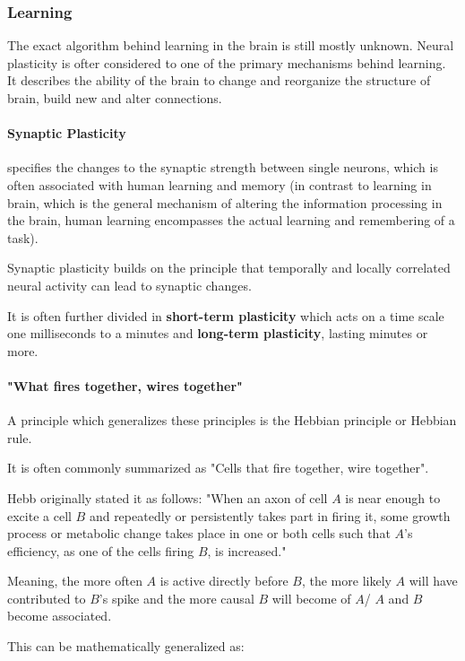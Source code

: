 \subsubsection{Learning}

The exact algorithm behind learning in the brain is still mostly unknown.
Neural plasticity is ofter considered to one of the primary mechanisms behind learning. 
It describes the ability of the brain to change and reorganize the structure of brain, build new and alter connections.  

\paragraph{Synaptic Plasticity} specifies the changes to the synaptic strength between single neurons, which is often associated with human learning and memory (in contrast to learning in brain, which is the general mechanism of altering the information processing in the brain, human learning encompasses the actual learning and remembering of a task). 

Synaptic plasticity builds on the principle that temporally and locally correlated neural activity  can lead to synaptic changes.

It is often further divided in \textbf{short-term plasticity} which acts on a time scale one milliseconds to a minutes and \textbf{long-term plasticity}, lasting minutes or more.


\paragraph{"What fires together, wires together"} A principle which generalizes these principles is the Hebbian principle or Hebbian rule.

It is often commonly summarized as "Cells that fire together, wire together".

Hebb originally stated it as follows: "When an axon of cell $A$ is near enough to excite a cell $B$ and repeatedly or persistently takes part in firing it, some growth process or metabolic change takes place in one or both cells such that $A$'s efficiency, as one of the cells firing $B$, is increased."

Meaning, the more often $A$ is active directly before $B$, the more likely $A$ will have contributed to $B$'s spike and the more causal $B$ will become of $A$/ $A$ and $B$ become associated.

This can be mathematically generalized as: 

